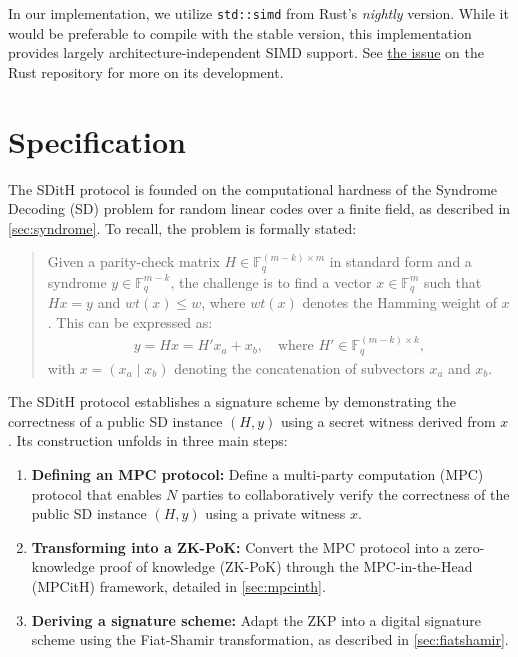 \documentclass[11pt]{report}
\theoremstyle{definition}
\theoremstyle{plain}
\begin{document}
In our implementation, we utilize \texttt{std::simd} from Rust's \textit{nightly} version. While it would be preferable to compile with the stable version, this implementation provides largely architecture-independent SIMD support. See \href{https://github.com/rust-lang/rust/issues/86656}{the issue} on the Rust repository for more on its development.

\chapter{Specification}\label{ch:spec}

The SDitH protocol is founded on the computational hardness of the Syndrome Decoding (SD) problem for random linear codes over a finite field, as described in \autoref{sec:syndrome}. To recall, the problem is formally stated:
\begin{quote}
  Given a parity-check matrix $H \in \mathbb{F}_q^{(m-k) \times m}$ in standard form and a syndrome $y \in \mathbb{F}_q^{m-k}$, the challenge is to find a vector $x \in \mathbb{F}_q^m$ such that $Hx = y$ and $wt(x) \leq w$, where $wt(x)$ denotes the Hamming weight of $x$. This can be expressed as:
  \begin{align*}
    y = Hx = H'x_a + x_b, \quad \text{where } H' \in \mathbb{F}_q^{(m-k) \times k},
  \end{align*}
  with $x = (x_a \mid x_b)$ denoting the concatenation of subvectors $x_a$ and $x_b$.
\end{quote}

The SDitH protocol establishes a signature scheme by demonstrating the correctness of a public SD instance $(H, y)$ using a secret witness derived from $x$. Its construction unfolds in three main steps:
\begin{enumerate}
  \item \textbf{Defining an MPC protocol:} Define a multi-party computation (MPC) protocol that enables $N$ parties to collaboratively verify the correctness of the public SD instance $(H, y)$ using a private witness $x$.
  \item \textbf{Transforming into a ZK-PoK:} Convert the MPC protocol into a zero-knowledge proof of knowledge (ZK-PoK) through the MPC-in-the-Head (MPCitH) framework, detailed in \autoref{sec:mpcinth}.
  \item \textbf{Deriving a signature scheme:} Adapt the ZKP into a digital signature scheme using the Fiat-Shamir transformation, as described in \autoref{sec:fiatshamir}.
\end{enumerate}
\end{document}
